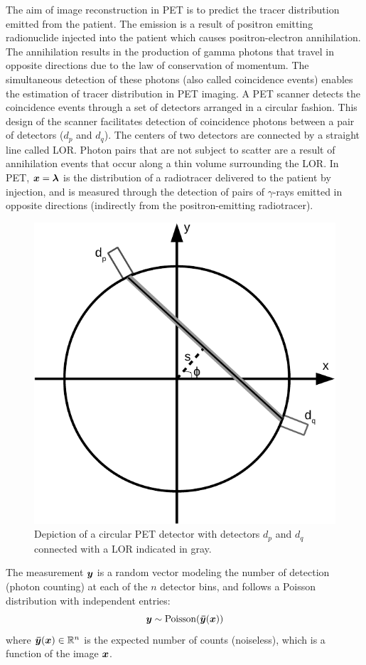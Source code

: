 The aim of image reconstruction in \ac{PET} is to predict the tracer distribution emitted from the patient. The emission is a result of positron emitting radionuclide injected into the patient which causes positron-electron annihilation. The annihilation results in the production of gamma photons that travel in opposite directions due to the law of conservation of momentum. The simultaneous detection of these photons (also called coincidence events) enables the estimation of tracer distribution in \ac{PET} imaging. A \ac{PET} scanner detects the coincidence events through a set of detectors arranged in a circular fashion. This design of the scanner facilitates detection of coincidence photons between a pair of detectors ($d_p$ and $d_q$). The centers of two detectors are connected by a straight line called \ac{LOR}. Photon pairs that are not subject to scatter are a result of annihilation events that occur along a thin volume surrounding the \ac{LOR}. In \ac{PET}, $\bm{x} = \bm{\lambda}$ is the distribution of a radiotracer delivered to the patient by injection, and is measured through the detection of pairs of $\gamma$-rays emitted in opposite directions (indirectly from the positron-emitting radiotracer).

\begin{figure}[!htbp]
	\centering
	\includegraphics[width=0.6\linewidth]{./Figures/PET_det-crop.pdf}
	\caption{Depiction of a circular \ac{PET} detector with detectors $d_p$ and $d_q$ connected with a \ac{LOR} indicated in gray.}
	\label{fig:three}
\end{figure}


The measurement $\bm{y}$ is a random vector modeling the number of detection (photon counting) at each of the $n$ detector bins, and follows a Poisson distribution with independent entries:
\begin{equation}\label{eq:poisson}
\bm{y} \sim \mathrm{Poisson}(\bm{\bar{y}}(\bm{x}))
\end{equation}    
where $\bm{\bar{y}}(\bm{x}) \in \mathbb{R}^n$ is the expected number of counts (noiseless), which is a function of the image $\bm{x}$. 

